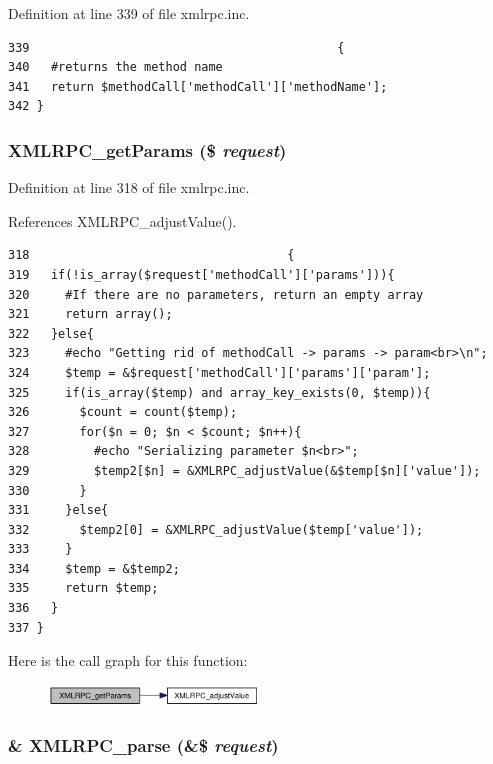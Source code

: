 Definition at line 339 of file xmlrpc.inc.

\begin{Code}\begin{verbatim}339                                           {
340   #returns the method name
341   return $methodCall['methodCall']['methodName'];
342 }
\end{verbatim}
\end{Code}


\hypertarget{xmlrpc_8inc_ce4ea8e1274ca2ee3f51ec5a724f00f3}{
\subsubsection{\setlength{\rightskip}{0pt plus 5cm}XMLRPC\_\-getParams (\$ {\em request})}}
\label{xmlrpc_8inc_ce4ea8e1274ca2ee3f51ec5a724f00f3}




Definition at line 318 of file xmlrpc.inc.

References XMLRPC\_\-adjustValue().

\begin{Code}\begin{verbatim}318                                    {
319   if(!is_array($request['methodCall']['params'])){
320     #If there are no parameters, return an empty array
321     return array();
322   }else{
323     #echo "Getting rid of methodCall -> params -> param<br>\n";
324     $temp = &$request['methodCall']['params']['param'];
325     if(is_array($temp) and array_key_exists(0, $temp)){
326       $count = count($temp);
327       for($n = 0; $n < $count; $n++){
328         #echo "Serializing parameter $n<br>";
329         $temp2[$n] = &XMLRPC_adjustValue(&$temp[$n]['value']);
330       }
331     }else{
332       $temp2[0] = &XMLRPC_adjustValue($temp['value']);
333     }
334     $temp = &$temp2;
335     return $temp;
336   }
337 }
\end{verbatim}
\end{Code}




Here is the call graph for this function:\nopagebreak
\begin{figure}[H]
\begin{center}
\leavevmode
\includegraphics[width=159pt]{xmlrpc_8inc_ce4ea8e1274ca2ee3f51ec5a724f00f3_cgraph}
\end{center}
\end{figure}
\hypertarget{xmlrpc_8inc_708b2136ca600664d2207a511b3cf3f8}{
\subsubsection{\setlength{\rightskip}{0pt plus 5cm}\& XMLRPC\_\-parse (\&\$ {\em request})}}
\label{xmlrpc_8inc_708b2136ca600664d2207a511b3cf3f8}




